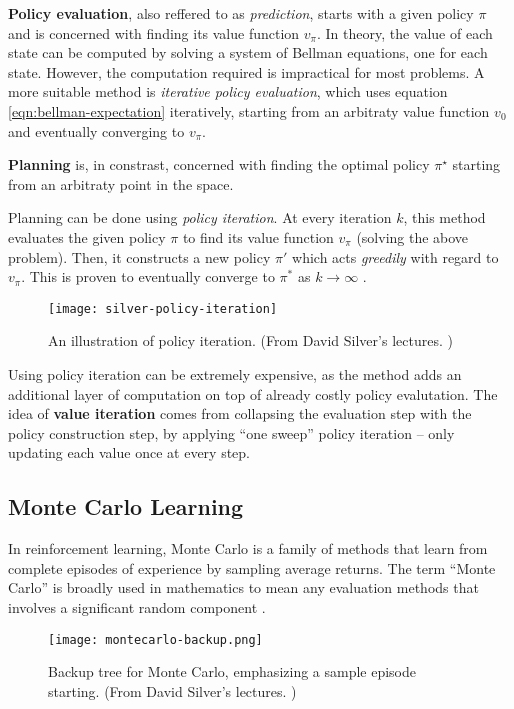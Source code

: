 \textbf{Policy evaluation}, also reffered to as \emph{prediction}, starts with a given policy $\pi$ and is concerned with finding its value function $v_{\pi}$.
In theory, the value of each state can be computed by solving a system of Bellman equations, one for each state.
However, the computation required is impractical for most problems.
A more suitable method is \emph{iterative policy evaluation}, which uses equation \ref{eqn:bellman-expectation} iteratively, starting from an arbitraty value function $v_0$ and eventually converging to $v_{\pi}$.

\textbf{Planning} is, in constrast, concerned with finding the optimal policy $\pi^{\star}$ starting from an arbitraty point in the space.

Planning can be done using \emph{policy iteration}.
At every iteration $k$, this method evaluates the given policy $\pi$ to find its value function $v_{\pi}$ (solving the above problem).
Then, it constructs a new policy $\pi'$ which acts \emph{greedily} with regard to $v_{\pi}$.
This is proven to eventually converge to $\pi^*$ as $k \to \infty$ \cite{rlai}.

\begin{figure}[h]
    \caption{An illustration of policy iteration. (From David Silver's lectures. \cite{silver-lectures})}
    \centering
    \texttt{[image: silver-policy-iteration]}
\end{figure}

Using policy iteration can be extremely expensive, as the method adds an additional layer of computation on top of already costly policy evalutation.
The idea of \textbf{value iteration} comes from collapsing the evaluation step with the policy construction step, by applying ``one sweep'' policy iteration -- only updating each value once at every step.

\subsection{Monte Carlo Learning} \label{rl:mc}
In reinforcement learning, Monte Carlo is a family of methods that learn from complete episodes of experience by sampling average returns.
The term “Monte Carlo” is broadly used in mathematics to mean any evaluation methods that involves a significant random component \cite{rlai}.

\begin{figure}[ht]
    \caption{Backup tree for Monte Carlo, emphasizing a sample episode starting. (From David Silver's lectures. \cite{silver-lectures})}
    \centering
    \texttt{[image: montecarlo-backup.png]}
\end{figure}

